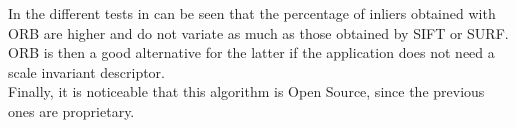 In the different tests in \cite{orb} can be seen that the percentage of inliers obtained with ORB are higher and do not variate as much as those obtained by SIFT or SURF. 
ORB is then a good alternative for the latter if the application does not need a scale invariant descriptor. 
\\

Finally, it is noticeable that this algorithm is Open Source, since the previous ones are proprietary. 
